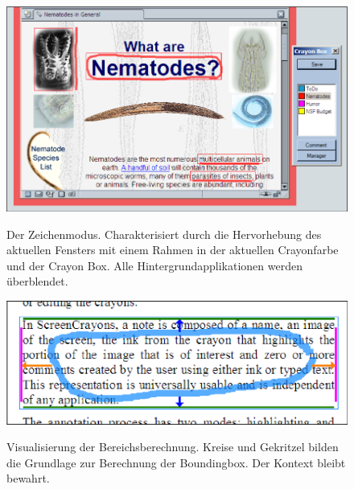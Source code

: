 \begin{figure}
        {\includegraphics[width=\linewidth]{gfx/olsenHighlighting}}
		\caption[Crayon Highlighting.]{Der Zeichenmodus. Charakterisiert durch die Hervorhebung des aktuellen Fensters mit einem Rahmen in der aktuellen Crayonfarbe und der Crayon Box. Alle Hintergrundapplikationen werden überblendet.}\label{fig:olsenHighlighting}
\end{figure}

\begin{figure}
        {\includegraphics[width=\linewidth]{gfx/olsenRegionFinding}}
		\caption[Finding Regions for Circles/Scribbles.]{Visualisierung der Bereichsberechnung. Kreise und Gekritzel bilden die Grundlage zur Berechnung der Boundingbox. Der Kontext bleibt bewahrt.}\label{fig:olsenRegionFinding}
\end{figure}

